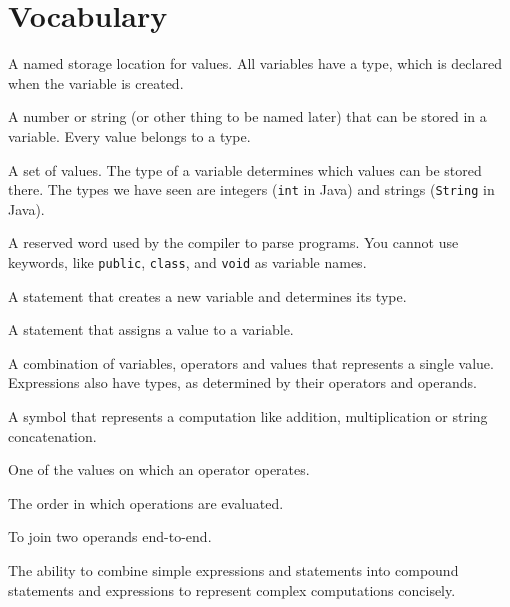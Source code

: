 \section{Vocabulary}

\begin{description}

A named storage location for values.
All variables have a type, which is declared when the variable is created.

A number or string (or other thing to be named later) that can be stored in a variable.
Every value belongs to a type.

A set of values.
The type of a variable determines which values can be stored there.
The types we have seen are integers ({\tt int} in Java) and strings ({\tt String} in Java).

A reserved word used by the compiler to parse programs.
You cannot use keywords, like {\tt public}, {\tt class}, and {\tt void} as variable names.

A statement that creates a new variable and determines its type.

A statement that assigns a value to a variable.

A combination of variables, operators and values that represents a single value.
Expressions also have types, as determined by their operators and operands.

A symbol that represents a computation like addition, multiplication or string concatenation.

One of the values on which an operator operates.

The order in which operations are evaluated.

To join two operands end-to-end.

The ability to combine simple expressions and statements into compound statements and expressions to represent complex computations concisely.

\end{description}
